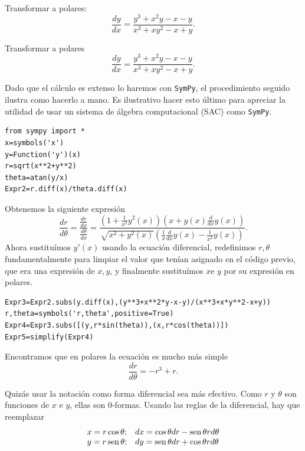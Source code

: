 \begin{ejemplo} Transformar a polares:
  \[\frac{dy}{dx}=\frac{y^3+x^2y-x-y}{x^3+xy^2-x+y}.\]
\end{ejemplo}

\begin{ejemplo} Transformar a polares
 \[
  \frac{dy}{dx}=\frac{y^3+x^2y-x-y}{x^3+xy^2-x+y}.
 \]
\end{ejemplo}
 
Dado que el cálculo es extenso lo haremos con \texttt{SymPy}, el procedimiento seguido ilustra como hacerlo a mano. Es ilustrativo hacer esto último para apreciar la utilidad de usar un sistema de álgebra computacional (SAC) como \texttt{SymPy}.



\begin{lstlisting}
from sympy import *
x=symbols('x')
y=Function('y')(x)
r=sqrt(x**2+y**2)
theta=atan(y/x)
Expr2=r.diff(x)/theta.diff(x)
\end{lstlisting}

Obtenemos la siguiente expresión 
\[\frac{dr}{d\theta}=\frac{\frac{dr}{dx}}{\frac{d\theta}{dx}}=\frac{\left(1 + \frac{1}{x^{2}} y^{2}{\left (x \right )}\right) \left(x + y{\left (x \right )} \frac{d}{d x} y{\left (x \right )}\right)}{\sqrt{x^{2} + y^{2}{\left (x \right )}} \left(\frac{1}{x} \frac{d}{d x} y{\left (x \right )} - \frac{1}{x^{2}} y{\left (x \right )}\right)}.\]
Ahora sustituímos $y'(x)$ usando la ecuación diferencial, redefinimos $r,\theta$ fundamentalmente para limpiar el valor que tenían asignado en el código previo, que era una expresión de $x,y$, y finalmente sustituímos $x$e $y$ por su expresión en polares. 

\begin{lstlisting}
Expr3=Expr2.subs(y.diff(x),(y**3+x**2*y-x-y)/(x**3+x*y**2-x+y))
r,theta=symbols('r,theta',positive=True)
Expr4=Expr3.subs([(y,r*sin(theta)),(x,r*cos(theta))])
Expr5=simplify(Expr4)
\end{lstlisting}
 Encontramos que en polares la ecuación es mucho más simple
\[\frac{dr}{d\theta}=-r^3+r.\]

 Quizás  usar la notación como  forma diferencial sea más efectivo. Como $r$ y $\theta$ son funciones de $x$ e $y$, ellas son 0-formas. Usando las reglas de la diferencial, hay que reemplazar
\[
\begin{array}{ll}
x=r\cos\theta; &dx=\cos\theta dr-\operatorname{sen}\theta r d\theta\\
 y= r\operatorname{sen}\theta; & dy=\operatorname{sen}\theta dr+\cos\theta r d\theta\\
\end{array}
\]

